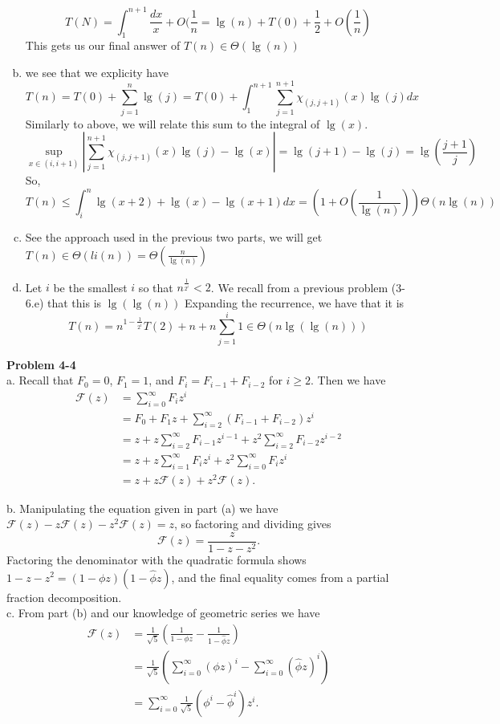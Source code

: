 \documentclass{article}
\begin{document}
\begin{enumerate}[a)]
\[
T(N) = \int_1^{n+1} \frac{dx}{x} + O(\frac{1}{n} = \lg(n) + T(0) + \frac{1}{2} + O(\frac{1}{n})
\]
This gets us our final answer of $T(n) \in \Theta(\lg(n))$
\item
we see that we explicity have
\[
T(n) = T(0) +\sum_{j=1}^n \lg(j) = T(0) + \int_1^{n+1} \sum_{j=1}^{n+1} \chi_{(j,j+1)}(x)\lg(j) dx 
\]
Similarly to above, we will relate this sum to the integral of $\lg(x)$. 
\[
\sup_{x\in (i,i+1)}  \left|\sum_{j=1}^{n+1} \chi_{(j,j+1)}(x)\lg(j)  - \lg(x)\right| = \lg(j+1) - \lg(j) = \lg\left(\frac{j+1}{j}\right)
\]
So, 
\[
T(n) \le \int_{i}^n \lg(x+2) + \lg(x) - \lg(x+1) dx  = (1  + O(\frac{1}{\lg(n)}))\Theta(n\lg(n))
\]
\item
See the approach used in the previous two parts, we will get $T(n) \in \Theta(li(n))= \Theta( \frac{n}{\lg(n)})$
\item
Let $i$ be the smallest $i$ so that $n^{\frac{1}{2^i}}<2$. We recall from a previous problem (3-6.e) that this is $\lg(\lg(n))$ Expanding the recurrence, we have that it is 
\[
T(n) = n^{1 - \frac{1}{2^i}} T(2) + n + n \sum_{j=1}^i 1 \in \Theta(n\lg(\lg(n)))
\]

\end{enumerate}

\noindent\textbf{Problem 4-4}\\

a. Recall that $F_0 = 0$, $F_1 = 1$, and $F_i = F_{i-1} + F_{i-2}$ for $i \geq 2$.  Then we have
\begin{align*}
\mathcal{F}(z) &= \sum_{i=0}^\infty F_i z^i \\
&= F_0 + F_1z + \sum_{i=2}^\infty (F_{i-1} + F_{i-2})z^i \\
&= z + z\sum_{i=2}^\infty F_{i-1}z^{i-1} + z^2\sum_{i=2}^\infty F_{i-2}z^{i-2} \\
&= z + z\sum_{i=1}^\infty F_{i}z^{i} + z^2\sum_{i=0}^\infty F_{i}z^{i} \\
&= z + z\mathcal{F}(z) + z^2\mathcal{F}(z).
\end{align*}

b. Manipulating the equation given in part (a) we have $\mathcal{F}(z) - z\mathcal{F}(z) - z^2\mathcal{F}(z) = z$, so factoring and dividing gives 
\[ \mathcal{F}(z) = \frac{z}{1-z-z^2}.\]
Factoring the denominator with the quadratic formula shows $1 - z - z^2 = (1-\phi z)(1 - \hat{\phi} z)$, and the final equality comes from a partial fraction decomposition. \\

c. From part (b) and our knowledge of geometric series we have
\begin{align*}
 \mathcal{F}(z) &= \frac{1}{\sqrt{5}}\left(\frac{1}{1-\phi z} - \frac{1}{1-\hat{\phi}z}\right) \\
&= \frac{1}{\sqrt{5}}\left(\sum_{i=0}^\infty (\phi z)^i - \sum_{i=0}^\infty (\hat{\phi}z)^i \right) \\
&=\sum_{i=0}^\infty  \frac{1}{\sqrt{5}} (\phi^i - \hat{\phi}^i)z^i.
\end{align*}
\end{document}
